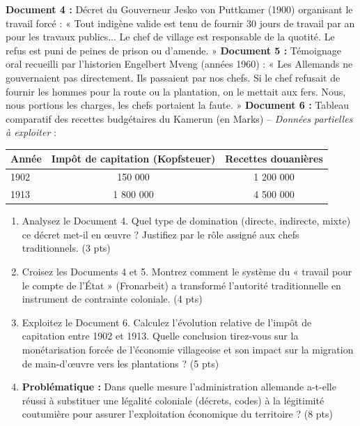 \documentclass[11pt]{article}
\begin{document}
\begin{exercice}
\textbf{Document 4 :} Décret du Gouverneur Jesko von Puttkamer (1900) organisant le travail forcé : « Tout indigène valide est tenu de fournir 30 jours de travail par an pour les travaux publics... Le chef de village est responsable de la quotité. Le refus est puni de peines de prison ou d'amende. »
\textbf{Document 5 :} Témoignage oral recueilli par l'historien Engelbert Mveng (années 1960) : « Les Allemands ne gouvernaient pas directement. Ils passaient par nos chefs. Si le chef refusait de fournir les hommes pour la route ou la plantation, on le mettait aux fers. Nous, nous portions les charges, les chefs portaient la faute. »
\textbf{Document 6 :} Tableau comparatif des recettes budgétaires du Kamerun (en Marks) -- \textit{Données partielles à exploiter} :
\begin{tabular}{lcc}
\hline
\textbf{Année} & \textbf{Impôt de capitation (Kopfsteuer)} & \textbf{Recettes douanières} \\
\hline
1902 & 150 000 & 1 200 000 \\
1913 & 1 800 000 & 4 500 000 \\
\hline
\end{tabular}

\begin{enumerate}
    \item Analysez le Document 4. Quel type de domination (directe, indirecte, mixte) ce décret met-il en œuvre ? Justifiez par le rôle assigné aux chefs traditionnels. (3 pts)
    \item Croisez les Documents 4 et 5. Montrez comment le système du « travail pour le compte de l'État » (Fronarbeit) a transformé l'autorité traditionnelle en instrument de contrainte coloniale. (4 pts)
    \item Exploitez le Document 6. Calculez l'évolution relative de l'impôt de capitation entre 1902 et 1913. Quelle conclusion tirez-vous sur la monétarisation forcée de l'économie villageoise et son impact sur la migration de main-d'œuvre vers les plantations ? (5 pts)
    \item \textbf{Problématique :} Dans quelle mesure l'administration allemande a-t-elle réussi à substituer une légalité coloniale (décrets, codes) à la légitimité coutumière pour assurer l'exploitation économique du territoire ? (8 pts)
\end{enumerate}
\end{exercice}
\end{document}
